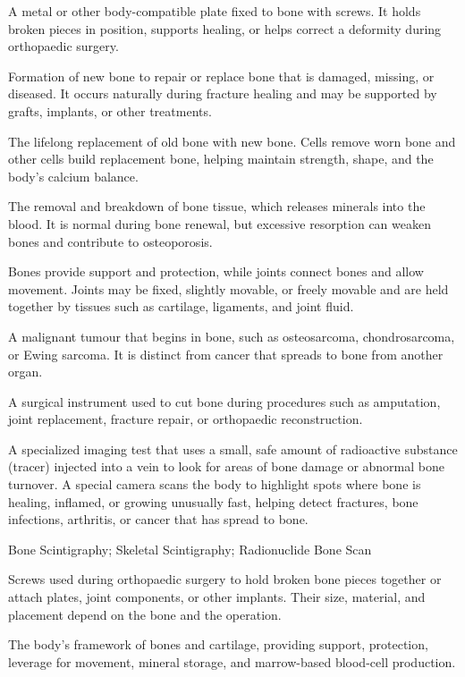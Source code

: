  A metal or other body-compatible plate fixed to bone with screws. It holds broken pieces in position, supports healing, or helps correct a deformity during orthopaedic surgery.

 Formation of new bone to repair or replace bone that is damaged, missing, or diseased. It occurs naturally during fracture healing and may be supported by grafts, implants, or other treatments.

 The lifelong replacement of old bone with new bone. Cells remove worn bone and other cells build replacement bone, helping maintain strength, shape, and the body's calcium balance.

 The removal and breakdown of bone tissue, which releases minerals into the blood. It is normal during bone renewal, but excessive resorption can weaken bones and contribute to osteoporosis.

 Bones provide support and protection, while joints connect bones and allow movement. Joints may be fixed, slightly movable, or freely movable and are held together by tissues such as cartilage, ligaments, and joint fluid.

 A malignant tumour that begins in bone, such as osteosarcoma, chondrosarcoma, or Ewing sarcoma. It is distinct from cancer that spreads to bone from another organ.

 A surgical instrument used to cut bone during procedures such as amputation, joint replacement, fracture repair, or orthopaedic reconstruction.

 A specialized imaging test that uses a small, safe amount of radioactive substance (tracer) injected into a vein to look for areas of bone damage or abnormal bone turnover. A special camera scans the body to highlight spots where bone is healing, inflamed, or growing unusually fast, helping detect fractures, bone infections, arthritis, or cancer that has spread to bone.

\synonyms
Bone Scintigraphy; Skeletal Scintigraphy; Radionuclide Bone Scan

 Screws used during orthopaedic surgery to hold broken bone pieces together or attach plates, joint components, or other implants. Their size, material, and placement depend on the bone and the operation.

 The body’s framework of bones and cartilage, providing support, protection, leverage for movement, mineral storage, and marrow-based blood-cell production.

